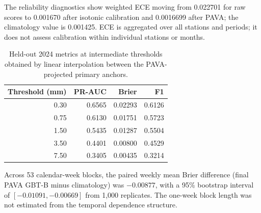 The reliability diagnostics show weighted ECE moving from 0.022701 for raw
scores to 0.001670 after isotonic calibration and 0.0016699 after PAVA; the
climatology value is 0.001425. ECE is aggregated over all stations and periods;
it does not assess calibration within individual stations or months.

\begin{table}[htbp]
\centering\small
\caption{Held-out 2024 metrics at intermediate thresholds obtained by linear
interpolation between the PAVA-projected primary anchors.}
\label{tab:interpolation}
\begin{tabular}{r r r r}
\toprule
Threshold (mm) & PR-AUC & Brier & F1 \\
\midrule
0.30 & 0.6565 & 0.02293 & 0.6126 \\
0.75 & 0.6130 & 0.01751 & 0.5723 \\
1.50 & 0.5435 & 0.01287 & 0.5504 \\
3.50 & 0.4401 & 0.00800 & 0.4529 \\
7.50 & 0.3405 & 0.00435 & 0.3214 \\
\bottomrule
\end{tabular}
\end{table}

Across 53 calendar-week blocks, the paired weekly mean Brier difference
(final PAVA GBT-B minus climatology) was $-0.00877$, with a 95\% bootstrap
interval of $[-0.01091,-0.00669]$ from 1,000 replicates. The one-week block
length was not estimated from the temporal dependence structure.

